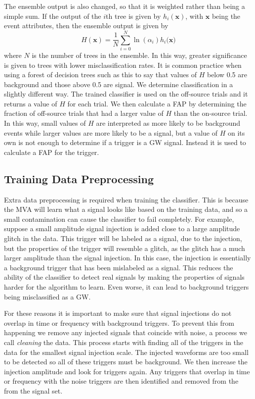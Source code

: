 \documentclass[11pt]{cuthesis}
\begin{document}
The ensemble output is also changed, so that it is weighted rather than being a simple sum. If the output of the $i$th tree is given by $h_i(\textbf{x})$, with $\textbf{x}$ being the event attributes, then the ensemble output is given by \cite{tmva_guide}
\begin{equation}
H(\textbf{x}) = \frac{1}{N}\sum_{i=0}^N \ln(\alpha_i)h_i(\textbf{x)}
\end{equation}  
where $N$ is the number of trees in the ensemble. In this way, greater significance is given to trees with lower misclassification rates. It is common practice when using a forest of decision trees such as this to say that values of $H$ below 0.5 are background and those above 0.5 are signal. We determine classification in a slightly different way. The trained classifier is used on the off-source trials and it returns a value of $H$ for each trial. We then calculate a FAP by determining the fraction of off-source trials that had a larger value of $H$ than the on-source trial. In this way, small values of $H$ are interpreted as more likely to be background events while larger values are more likely to be a signal, but a value of $H$ on its own is not enough to determine if a trigger is a GW signal. Instead it is used to calculate a FAP for the trigger.

\subsection{Training Data Preprocessing}\label{sec:data-preprocessing}
Extra data preprocessing is required when training the classifier. This is because the MVA will learn what a signal looks like based on the training data, and so a small contamination can cause the classifier to fail completely. For example, suppose a small amplitude signal injection is added close to a large amplitude glitch in the data. This trigger will be labeled as a signal, due to the injection, but the properties of the trigger will resemble a glitch, as the glitch has a much larger amplitude than the signal injection. In this case, the injection is essentially a background trigger that has been mislabeled as a signal. This reduces the ability of the classifier to detect real signals by making the properties of signals harder for the algorithm to learn. Even worse, it can lead to background triggers being misclassified as a GW.  

For these reasons it is important to make sure that signal injections do not overlap in time or frequency with background triggers. To prevent this from happening we remove any injected signals that coincide with noise, a process we call \textit{cleaning} the data. This process starts with finding all of the triggers in the data for the smallest signal injection scale. The injected waveforms are too small to be detected so all of these triggers must be background. We then increase the injection amplitude and look for triggers again. Any triggers that overlap in time or frequency with the noise triggers are then identified and removed from the from the signal set. 
\end{document}
